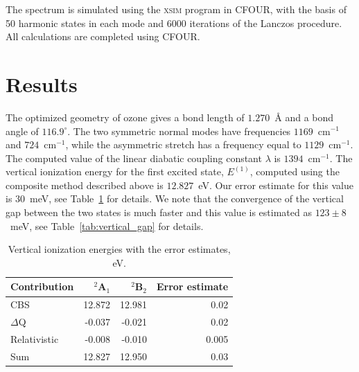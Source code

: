\documentclass[
12pt,
a4paper,
prb,
superscriptaddress,
]{revtex4}
\begin{document}
The spectrum is simulated using the \textsc{xsim} program in \textsc{CFOUR},
with the basis of 50 harmonic states in each mode and 6000 iterations of the
Lanczos procedure.~\cite{Sharma:xsim_socjt:2024} All calculations are
completed using \textsc{CFOUR}.~\cite{cfour, cfour:2020}


\section{Results}


The optimized geometry of ozone gives a bond length of $1.270$~\AA{} and a
bond angle of $116.9^\circ$. The two symmetric normal modes have frequencies
$1169$~cm$^{-1}$ and $724$~cm$^{-1}$, while the asymmetric stretch has a
frequency equal to $1129$~cm$^{-1}$. The computed value of the linear diabatic
coupling constant $\lambda$ is $1394$~cm$^{-1}$. The vertical ionization
energy for the first excited state, $E^{(1)}$, computed using the composite
method described above is  $12.827$~eV. Our error estimate for this value is
$30$~meV, see Table~\ref{tab:vertical_ionization_energy} for details.  We note
that the convergence of the vertical gap between the two states is much faster
and this value is estimated as $123\pm8$~meV, see Table~\ref{tab:vertical_gap}
for details. 

\begin{table}
    \caption{
        Vertical ionization energies with the error estimates, eV.
    }
    \label{tab:vertical_ionization_energy}
    \begin{center}
        \begin{tabular}[c]{|l|rr|r|}
            \hline
            Contribution  & $^2$A$_1$ & $^2$B$_2$ & Error estimate \\ \hline
            CBS           & 12.872    & 12.981    & 0.02 \\
            $\Delta$Q     & -0.037    & -0.021    & 0.02 \\
            Relativistic  & -0.008    & -0.010    & 0.005 \\ \hline
            Sum           & 12.827    & 12.950    & 0.03 \\ \hline
        \end{tabular}
    \end{center}
\end{table}
\end{document}
